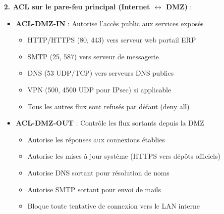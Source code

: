 \medskip

\noindent \textbf{2. ACL sur le pare-feu principal (Internet $\leftrightarrow$ DMZ)} :\\
\begin{itemize}
  \item \textbf{ACL-DMZ-IN} : Autorise l'accès public aux services exposés
  \begin{itemize}
    \item HTTP/HTTPS (80, 443) vers serveur web portail ERP
    \item SMTP (25, 587) vers serveur de messagerie
    \item DNS (53 UDP/TCP) vers serveurs DNS publics
    \item VPN (500, 4500 UDP pour IPsec) si applicable
    \item Tous les autres flux sont refusés par défaut (deny all)
  \end{itemize}
  
  \item \textbf{ACL-DMZ-OUT} : Contrôle les flux sortants depuis la DMZ
  \begin{itemize}
    \item Autorise les réponses aux connexions établies
    \item Autorise les mises à jour système (HTTPS vers dépôts officiels)
    \item Autorise DNS sortant pour résolution de noms
    \item Autorise SMTP sortant pour envoi de mails
    \item Bloque toute tentative de connexion vers le LAN interne
  \end{itemize}
\end{itemize}

\medskip

